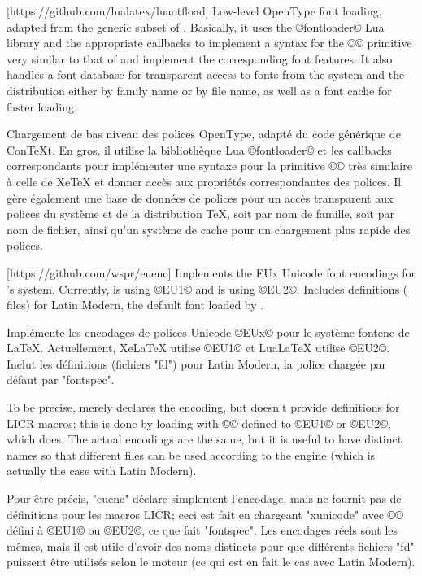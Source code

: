 \documentclass{lltxdoc}
\begin{document}
[https://github.com/lualatex/luaotfload]
Low-level OpenType font loading, adapted from the generic subset of \context.
Basically, it uses the ©fontloader© Lua library and the appropriate callbacks
to implement a syntax for the ©\font© primitive very similar to that of \xetex
and implement the corresponding font features. It also handles a font database
for transparent access to fonts from the system and the \tex distribution
either by family name or by file name, as well as a font cache for faster
loading.

Chargement de bas niveau des polices OpenType, adapté du code générique de ConTeXt. En gros, il utilise la bibliothèque Lua ©fontloader© et les callbacks correspondants pour implémenter une syntaxe pour la primitive ©\font© très similaire à celle de XeTeX et donner accès aux propriétés correspondantes des polices. Il gère également une base de données de polices pour un accès transparent aux polices du système et de la distribution TeX, soit par nom de famille, soit par nom de fichier, ainsi qu'un système de cache pour un chargement plus rapide des polices.

[https://github.com/wspr/euenc]
Implements the EUx Unicode font encodings for \latex's  system.
Currently, \xelatex is using ©EU1© and \lualatex is using ©EU2©. Includes
definitions ( files) for Latin Modern, the default font loaded by
.

Implémente les encodages de polices Unicode ©EUx© pour le système fontenc de LaTeX. Actuellement, XeLaTeX utilise ©EU1© et LuaLaTeX utilise ©EU2©. Inclut les définitions (fichiers "fd") pour Latin Modern, la police chargée par défaut par "fontspec".

To be precise,  merely declares the encoding, but
doesn't provide definitions for LICR macros; this is done by loading
 with ©\UTFencname© defined to ©EU1© or ©EU2©, which
 does. The actual encodings are the same, but it is useful to
have distinct names so that different  files can be used according to
the engine (which is actually the case with Latin Modern).

Pour être précis, "euenc" déclare simplement l'encodage, mais ne fournit pas de définitions pour les macros LICR; ceci est fait en chargeant "xunicode" avec ©\UTFencname© défini à ©EU1© ou ©EU2©, ce que fait "fontspec". Les encodages réels sont les mêmes, mais il est utile d'avoir des noms distincts pour que différents fichiers "fd" puissent être utilisés selon le moteur (ce qui est en fait le cas avec Latin Modern).
\end{document}

